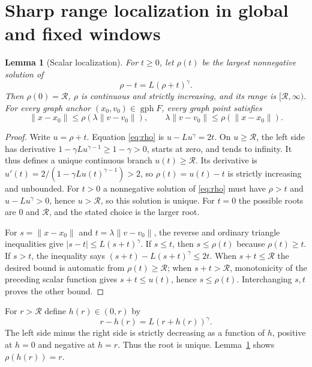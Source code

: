 \documentclass[11pt]{article}
\numberwithin{equation}{section}
\newtheorem{lemma}[theorem]{Lemma}
\theoremstyle{definition}
\theoremstyle{remark}
\newcommand{\gph}{\operatorname{gph}}
\newcommand{\rad}{\mathcal R}
\newcommand{\norm}[1]{\lVert #1\rVert}
\newcommand{\abs}[1]{\lvert #1\rvert}
\begin{document}
\section{Sharp range localization in global and fixed windows}
\label{sec:range}

\begin{lemma}[Scalar localization]\label{lem:rho}
For $t\ge0$, let $\rho(t)$ be the largest nonnegative solution of
\begin{equation}\label{eq:rho}
 \rho-t=L(\rho+t)^\gamma.
\end{equation}
Then $\rho(0)=\rad$, $\rho$ is continuous and strictly increasing,
and its range is $[\rad,\infty)$. For every graph anchor
$(x_0,v_0)\in\gph F$, every graph point satisfies
\begin{equation}\label{eq:localization}
 \norm{x-x_0}\le\rho(\lambda\norm{v-v_0}),\qquad
 \lambda\norm{v-v_0}\le\rho(\norm{x-x_0}).
\end{equation}
\end{lemma}

\begin{proof}
Write $u=\rho+t$. Equation \eqref{eq:rho} is
$u-Lu^\gamma=2t$. On $u\ge\rad$, the left side has derivative
$1-\gamma Lu^{\gamma-1}\ge1-\gamma>0$, starts at zero, and tends to
infinity. It thus defines a unique continuous branch $u(t)\ge\rad$.
Its derivative is
$u'(t)=2/(1-\gamma Lu(t)^{\gamma-1})>2$, so
$\rho(t)=u(t)-t$ is strictly increasing and unbounded. For $t>0$ a
nonnegative solution of \eqref{eq:rho} must have $\rho>t$ and
$u-Lu^\gamma>0$, hence $u>\rad$, so this solution is unique. For
$t=0$ the possible roots are $0$ and $\rad$, and the stated choice is
the larger root.

For $s=\norm{x-x_0}$ and $t=\lambda\norm{v-v_0}$, the reverse and
ordinary triangle inequalities give
$\abs{s-t}\le L(s+t)^\gamma$. If $s\le t$, then $s\le\rho(t)$
because $\rho(t)\ge t$. If $s>t$, the inequality says
$(s+t)-L(s+t)^\gamma\le2t$. When $s+t\le\rad$ the desired bound
is automatic from $\rho(t)\ge\rad$; when $s+t>\rad$, monotonicity
of the preceding scalar function gives $s+t\le u(t)$, hence
$s\le\rho(t)$. Interchanging $s,t$ proves the other bound.
\end{proof}

For $r>\rad$ define $h(r)\in(0,r)$ by
\begin{equation}\label{eq:h}
 r-h(r)=L(r+h(r))^\gamma.
\end{equation}
The left side minus the right side is strictly decreasing as a function
of $h$, positive at $h=0$ and negative at $h=r$. Thus the root is
unique. Lemma~\ref{lem:rho} shows $\rho(h(r))=r$.
\end{document}
